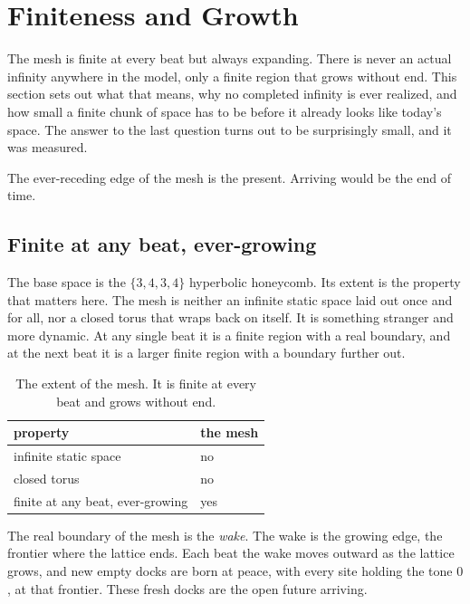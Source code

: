 \section{Finiteness and Growth}

The mesh is finite at every beat but always expanding. There is never an actual infinity anywhere in the model, only a finite region that grows without end. This section sets out what that means, why no completed infinity is ever realized, and how small a finite chunk of space has to be before it already looks like today's space. The answer to the last question turns out to be surprisingly small, and it was measured.

\begin{principle}
The ever-receding edge of the mesh is the present. Arriving would be the end of time.
\end{principle}

\subsection{Finite at any beat, ever-growing}

The base space is the $\{3,4,3,4\}$ hyperbolic honeycomb. Its extent is the property that matters here. The mesh is neither an infinite static space laid out once and for all, nor a closed torus that wraps back on itself. It is something stranger and more dynamic. At any single beat it is a finite region with a real boundary, and at the next beat it is a larger finite region with a boundary further out.

\begin{table}[ht]
\centering
\begin{tabular}{@{}ll@{}}
\toprule
property & the mesh \\
\midrule
infinite static space & no \\
closed torus & no \\
finite at any beat, ever-growing & yes \\
\bottomrule
\end{tabular}
\caption{The extent of the mesh. It is finite at every beat and grows without end.}
\label{tab:mesh-extent}
\end{table}

The real boundary of the mesh is the \emph{wake}. The wake is the growing edge, the frontier where the lattice ends. Each beat the wake moves outward as the lattice grows, and new empty docks are born at peace, with every site holding the tone $0$, at that frontier. These fresh docks are the open future arriving.

